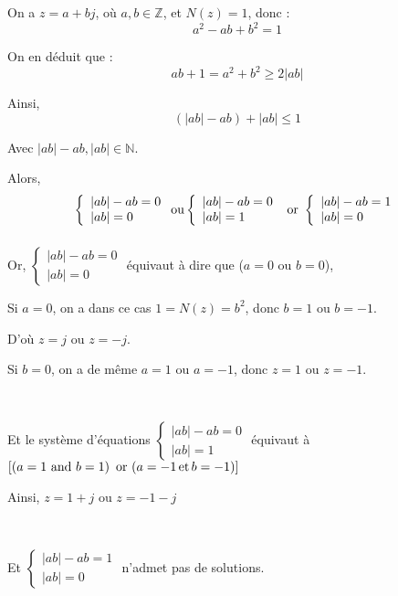 On a $z = a + b j$, o{\`u} $a, b \in \mathbb{Z}$, et $N (z) = 1$, donc :
\[ a^2 - a b + b^2 = 1 \]


On en d{\'e}duit que :
\[ a b + 1 = a^2 + b^2 \geqslant 2 | a b | \]


Ainsi,
\[ (| a b | - a b) + | a b | \leqslant 1 \]


Avec $| a b | - a b, | a b | \in \mathbb{N}$.

Alors,
\[ \left\{\begin{array}{l}
     | a b | - a b = 0\\
     | a b | = 0
   \end{array}\right. \operatorname{ou} \left\{\begin{array}{l}
     | a b | - a b = 0\\
     | a b | = 1
   \end{array}\right. \text{ or } \left\{\begin{array}{l}
     | a b | - a b = 1\\
     | a b | = 0
   \end{array}\right. \]
\[ \  \]


Or, $\left\{\begin{array}{l}
  | a b | - a b = 0\\
  | a b | = 0
\end{array}\right.$ {\'e}quivaut {\`a} dire que ($a = 0 \text{ ou $b = 0$}$),

Si $a = 0$, on a dans ce cas $1 = N (z) = b^2$, donc $b = 1$ ou $b = - 1$.

D'o{\`u} $z = j$ ou $z = - j$.

Si $b = 0$, on a de m{\^e}me $a = 1$ ou $a = - 1$, donc $z = 1$ ou $z = - 1$.

\

Et le syst{\`e}me d'{\'e}quations $\left\{\begin{array}{l}
  | a b | - a b = 0\\
  | a b | = 1
\end{array}\right.$ {\'e}quivaut {\`a} $\left[ \left( a = 1 \text{ and } b = 1
\right) \text{ or } (a = - 1 \operatorname{et} b = - 1) \right]$

Ainsi, $z = 1 + j$ ou $z = - 1 - j$

\

Et $\left\{\begin{array}{l}
  | a b | - a b = 1\\
  | a b | = 0
\end{array}\right.$ n'admet pas de solutions.

\

